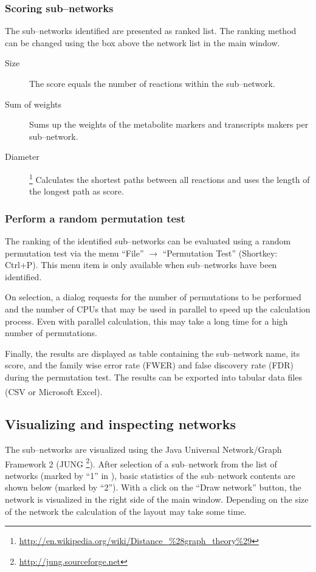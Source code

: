 \documentclass[titlepage,a4paper,twoside,9pt]{article}
\newcommand{\excel}{Microsoft\textsuperscript{\textregistered} Excel\textsuperscript{\textregistered}\xspace}
\newcommand{\mms}{metabolite markers\xspace}
\newcommand{\pref}[1]{\prettyref{#1}}
\newcommand{\menu}[3]{``#1'' $\rightarrow$ ``#2'' (Shortkey: Ctrl+#3)}
\begin{document}
\subsubsection{Scoring sub--networks}\label{sssec:scoring}

The sub--networks identified are presented as ranked list. The ranking method
can be changed using the box above the network list in the main window.

\begin{description}
	\item[Size] The score equals the number of reactions within the
		sub--network.
	\item[Sum of weights] Sums up the weights of the \mms and transcripts
		makers per sub--network.
	\item[Diameter]\footnote{\url{http://en.wikipedia.org/wiki/Distance\_\%28graph\_theory\%29}}
		Calculates the shortest paths between all reactions and uses the
		length of the longest path as score.
\end{description}

\subsubsection{Perform a random permutation test}

The ranking of the identified sub--networks can be evaluated using a random
permutation test via the menu \menu{File}{Permutation Test}{P}. This menu item
is only available when sub--networks have been identified. 

On selection, a dialog requests for the number of permutations to be performed
and the number of CPUs that may be used in parallel to speed up the
calculation process. Even with parallel calculation, this may take a long
time for a high number of permutations.

Finally, the results are displayed as table containing the sub--network name,
its score, and the family wise error rate (FWER) and false discovery rate
(FDR) during the permutation test. The results can be exported into tabular
data files (CSV or \excel).

\subsection{Visualizing and inspecting networks}

The sub--networks are visualized using the Java Universal Network/Graph
Framework 2 (JUNG \footnote{\url{http://jung.sourceforge.net}}). After
selection of a sub--network from the list of networks (marked by ``1'' in
\pref{fig:main}), basic statistics of the sub--network contents are shown
below (marked by ``2''). With a click on the ``Draw network'' button, the
network is visualized in the right side of the main window. Depending on the
size of the network the calculation of the layout may take some time.
\end{document}

